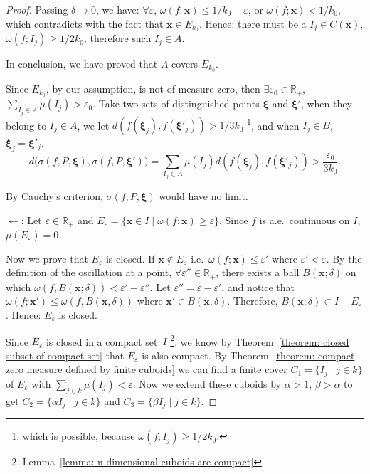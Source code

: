 \documentclass[openany]{book}
\theoremstyle{plain}
\theoremstyle{definition}
\newcommand*{\bv}{\boldsymbol} %
\begin{document}
\begin{proof}
	Passing $\delta \to 0$, we have: $\forall \varepsilon$, $\omega(f; \bv x) \leq 1/k_0 - \varepsilon$, or $\omega(f; \bv x) < 1/k_0$, which contradicts with the fact that $\bv x \in E_{k_0}$. Hence: there must be a $I_j \in C(\bv x)$, $\omega(f; I_j) \geq 1/2k_0$, therefore such $I_j \in A$.

	In conclusion, we have proved that $A$ covers $E_{k_0}$. 

	Since $E_{k_0}$, by our assumption, is not of measure zero, then $\exists \varepsilon_0 \in \mathbb R_+$, $\sum_{I_j \in A} \mu(I_j) > \varepsilon_0$. Take two sets of distinguished points $\bv \xi$ and $\bv \xi'$, when they belong to $I_j \in A$, we let $d(f(\bv \xi_j), f(\bv \xi'_j)) > 1/3k_0$
		\footnote{which is possible, because $\omega(f; I_j) \geq 1/2k_0$.}, and when $I_j \in B$, $\bv \xi_j = \bv \xi'_j$.
	\begin{equation*}
		d\big(\sigma(f, P, \bv \xi), \sigma(f, P, \bv \xi')\big) 
		= \sum_{I_j \in A} \mu(I_j) d(f(\bv \xi_j), f(\bv \xi'_j))
		> \frac{\varepsilon_0}{3k_0} .
	\end{equation*}

	By Cauchy's criterion, $\sigma(f, P, \bv \xi)$ would have no limit.

	$\gets$: Let $\varepsilon \in \mathbb R_+$ and $E_\varepsilon = \{\bv x \in I \mid \omega(f; \bv x) \geq \varepsilon\}$. Since $f$ is a.e.\ continuous on $I$, $\mu(E_\varepsilon) = 0$.

	Now we prove that $E_\varepsilon$ is closed. If $\bv x \notin E_\varepsilon$ i.e.\ $\omega(f; \bv x) \leq \varepsilon'$ where $\varepsilon' < \varepsilon$. 
	By the definition of the oscillation at a point, $\forall \varepsilon'' \in \mathbb R_+$, there exists a ball $B(\bv x; \delta)$ on which $\omega(f, B(\bv x; \delta)) < \varepsilon' + \varepsilon''$. 
	Let $\varepsilon'' = \varepsilon - \varepsilon'$, and notice that $\omega(f; \bv x') \leq \omega(f, B(\bv x, \delta))$ where $\bv x' \in B(\bv x, \delta)$. 
	Therefore, $B(\bv x; \delta) \subset I - E_\varepsilon$. 
	Hence: $E_\varepsilon$ is closed. 
	
	Since $E_\varepsilon$ is closed in a compact set~$I$
		\footnote{Lemma~\ref{lemma: n-dimensional cuboids are compact}}, 
	we know by Theorem~\ref{theorem: closed subset of compact set} that $E_\varepsilon$ is also compact. 
	By Theorem~\ref{theorem: compact zero measure defined by finite cuboids} we can find a finite cover $C_1 = \{I_j \mid j \in k\}$ of $E_\varepsilon$ with $\sum_{j \in k} \mu(I_j) < \varepsilon$. Now we extend these cuboids by $\alpha > 1$, $\beta > \alpha$ to get $C_2 = \{\alpha I_j \mid j \in k\}$ and $C_3 = \{\beta I_j \mid j \in k\}$.


\end{proof}
\end{document}
